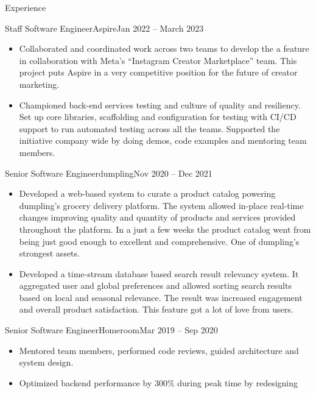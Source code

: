 \documentclass[colibri]{mcdowellcv}
\begin{document}
\begin{cvsection}{Experience}
	\begin{cvsubsection}{Staff Software Engineer}{Aspire}{Jan 2022 -- March 2023}
		\begin{itemize}
    \item Collaborated and coordinated work across two teams to develop the a
      feature in collaboration with Meta's ``Instagram Creator Marketplace''
      team. This project puts Aspire in a very competitive position for the
      future of creator marketing.
    \item Championed back-end services testing and culture of quality and
      resiliency. Set up core libraries, scaffolding and configuration for
      testing  with CI/CD support to run automated testing across all the teams.
      Supported the initiative company wide by doing demos, code examples and
      mentoring team members.
		\end{itemize}
  \end{cvsubsection}
	\begin{cvsubsection}{Senior Software Engineer}{dumpling}{Nov 2020 -- Dec 2021}
		\begin{itemize}
    \item Developed a web-based system to curate a product catalog powering dumpling's
      grocery delivery platform. The system allowed in-place real-time changes
      improving quality and quantity of products and services provided
      throughout the platform. In a just a few weeks the product catalog went
      from being just good enough to excellent and comprehensive. One of
      dumpling's strongest assets.
    \item Developed a time-stream database based search result relevancy
      system. It aggregated user and global preferences and allowed sorting
      search results based on local and seasonal relevance. The result was
      increased engagement and overall product satisfaction. This feature got a
      lot of love from users.
		\end{itemize}
	\end{cvsubsection}
	\begin{cvsubsection}{Senior Software Engineer}{Homeroom}{Mar 2019 -- Sep 2020}
		\begin{itemize}
    \item Mentored team members, performed code reviews, guided architecture and
      system design.
    \item Optimized backend performance by 300\% during peak time by redesigning

\end{itemize}
\end{cvsubsection}
\end{cvsection}
\end{document}
